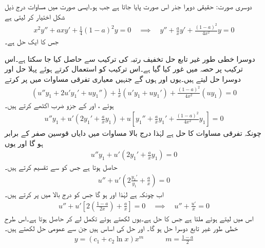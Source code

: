 دوسری صورت: حقیقی دوہرا جذر  اس صورت پایا جاتا ہے جب  ہو۔ایسی صورت میں مساوات  درج ذیل شکل اختیار کر لیتی ہے
\begin{align}\label{مساوات_سادہ_دو_یولر_کوشی_دوہرا_الف}
x^2y''+axy'+\frac{1}{4}(1-a)^2y=0 \quad \implies \quad y''+\frac{a}{x}y'+\frac{(1-a)^2}{4x^2}y=0
\end{align}
جس کا ایک حل  ہے۔

دوسرا خطی طور غیر تابع حل  تخفیف رتبہ کی ترکیب سے حاصل کیا جا سکتا ہے۔اس ترکیب پر حصہ  میں غور کیا گیا ہے۔اس ترکیب کو استعمال کرتے ہوئے پہلا حل  اور دوسرا حل  لیتے ہیں۔یوں  اور  ہوں گے جنہیں معیاری تفرقی مساوات  میں پر کرتے 
\begin{align*}
(u''y_1+2u'y_1'+uy_1'')+\frac{1}{x} (u'y_1+uy_1')+\frac{(1-a)^2}{4x^2}(uy_1)=0
\end{align*} 
ہوئے ،  اور  کے جزو ضرب اکٹھے کرتے ہیں۔
\begin{align*}
u''y_1+u'(2y_1'+\frac{a}{x}y_1)+u[y_1''+\frac{a}{x}y_1'+\frac{(1-a)^2}{4x^2}y_1]=0
\end{align*}
چونکہ  تفرقی مساوات کا حل ہے لہٰذا درج بالا مساوات میں دایاں قوسین صفر کے برابر ہو گا اور یوں 
\begin{align*}
u''y_1+u'(2y_1'+\frac{a}{x}y_1)=0
\end{align*}
حاصل ہوتا ہے جس کو  سے تقسیم کرتے ہیں۔
\begin{align*}
u''+u'\left(2\frac{y_1'}{y_1}+\frac{a}{x}\right)=0
\end{align*}
اب چونکہ  ہے لہٰذا  اور  ہو گا جس کو درج بالا میں پر کرتے  ہیں۔
\begin{align*}
u''+u'\left[2 \left(\frac{1-a}{2x}\right)+\frac{a}{x}\right]=0 \quad \implies \quad u''+\frac{u'}{x}=0
\end{align*}
اس میں  لیتے ہوئے  ملتا ہے جس کا حل  ہے۔یوں  لکھتے ہوئے تکمل لے کر  حاصل ہوتا ہے۔اس طرح خطی طور غیر تابع دوسرا حل  ہو گا۔ اور  حل کی اساس ہیں جن سے عمومی حل لکھتے ہیں۔
\begin{align}
y=(c_1+c_2\ln x)x^m \quad \quad \quad m=\frac{1-a}{2}
\end{align}

